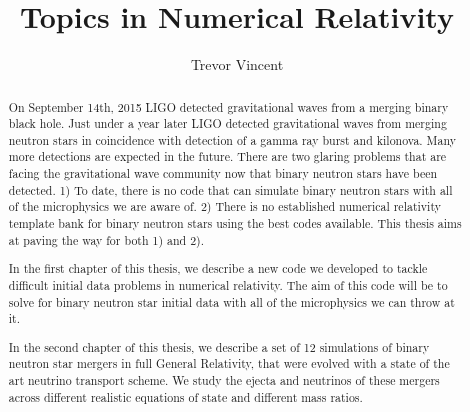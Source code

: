 \documentclass{ut-thesis}
\author{Trevor Vincent}
\title{Topics in Numerical Relativity}
\begin{document}
\begin{preliminary}

\maketitle


\begin{abstract}

  On September 14th, 2015 LIGO detected gravitational waves from a merging binary black hole. Just under a year later LIGO
  detected gravitational waves from merging neutron stars in coincidence with detection of a gamma ray burst and kilonova.
  Many more detections are expected in the future. There are two glaring problems that are facing the gravitational wave
  community now that binary neutron stars have been detected. 1) To date, there is no code that can simulate binary neutron stars with all of the microphysics we are aware of.
  2) There is no established numerical relativity template bank for binary neutron stars using the best codes available. This thesis
  aims at paving the way for both 1) and 2).

  In the first chapter of this thesis, we describe a new code we developed to tackle difficult initial data problems in
  numerical relativity. The aim of this code will be to solve for binary neutron star initial data with all of the microphysics
  we can throw at it.

  In the second chapter of this thesis, we describe a set of 12 simulations of binary neutron star mergers in full General Relativity,
  that were evolved with a state of the art neutrino transport scheme. We study the ejecta and neutrinos of these mergers across
  different realistic equations of state and different mass ratios. 
  
\end{abstract}



\end{preliminary}
\end{document}
